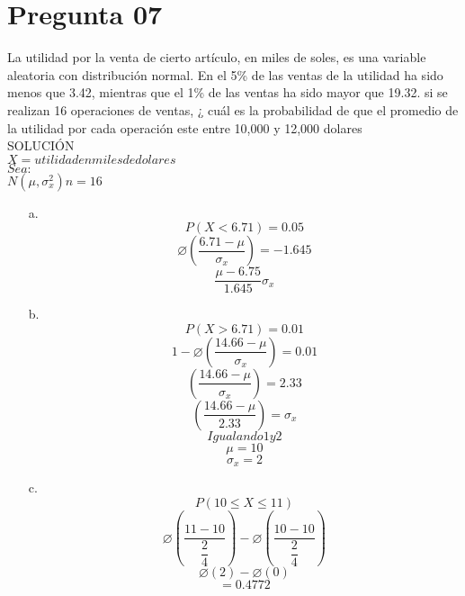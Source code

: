 \documentclass[10pt,a4paper]{article}
\begin{document}
\section{Pregunta 07}
La utilidad por la venta de cierto artículo, en miles de soles, es una variable aleatoria con distribución normal. En el 5\% de las ventas de la utilidad ha sido menos que 3.42, mientras que el 1\% de las ventas ha sido mayor que 19.32. si se realizan  16 operaciones de ventas, ¿ cuál es la probabilidad de que el promedio de la utilidad por cada operación este entre 10,000 y 12,000 dolares\\
SOLUCIÓN\\
$X = utilidad en miles de dolares$\\
$Sea:$\\
$N(\mu,\sigma_{x}^{2})	n = 16$
\begin{itemize}
\item[a.]
$$P(X<6.71) = 0.05$$
$$\varnothing(\dfrac{6.71-\mu}{\sigma_{x}}) = -1.645$$
\begin{equation}
\dfrac{\mu-6.75}{1.645}\sigma_{x}
\end{equation}
\item[b.]
$$P(X>6.71)=0.01$$
$$1-\varnothing(\dfrac{14.66-\mu}{\sigma_{x}}) = 0.01$$
$$(\dfrac{14.66-\mu}{\sigma_{x}}) = 2.33$$
\begin{equation}
(\dfrac{14.66-\mu}{2.33}) = \sigma_{x} 
\end{equation}
$$Igualando 1 y 2$$
$$\mu = 10$$
$$\sigma_{x} = 2$$
\item[c.]
$$P(10\leq X \leq 11)$$
$$\varnothing(\dfrac{11-10}{\dfrac{2}{4}}) - \varnothing(\dfrac{10-10}{\dfrac{2}{4}})$$
$$\varnothing(2)-\varnothing(0)$$
$$= 0.4772$$
\end{itemize}
\end{document}
